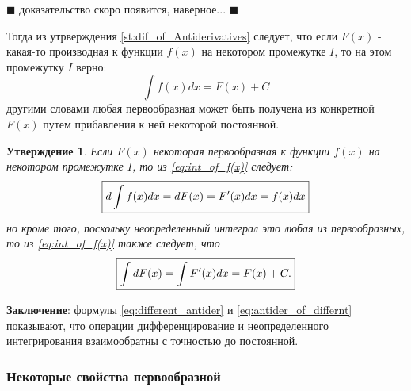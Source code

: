 \documentclass[a4paper,14pt]{article} %
\newtheorem{statement}{Утверждение}
\begin{document}
    $\blacksquare$  доказательство скоро появится, наверное... $\blacksquare$
    
    \bigskip
    \noindent Тогда из утрверждения \ref{st:dif_of_Antiderivatives} следует, что если $F(x)$ - какая-то производная к функции $f(x)$ на некотором промежутке $I$, то на этом промежутку $I$ верно: 
    \begin{equation}\label{eq:int_of_f(x)}
      \int f(x)dx = F(x) + C  
    \end{equation}
    другими словами любая первообразная может быть получена из конкретной $F(x)$ путем прибавления к ней некоторой постоянной.
    
    \begin{statement}
    Если \(F(x)\) некоторая первообразная к функции \(f(x)\) на некотором промежутке \(I\), то из \eqref{eq:int_of_f(x)} следует:
    \begin{equation}\label{eq:different_antider}
        \begin{boxed}
        {d\int f(x)dx = dF(x) = F^\prime{}(x)dx = f(x)dx}
        \end{boxed}
    \end{equation}
    но кроме того, поскольку неопределенный интеграл это любая из первообразных, то из \eqref{eq:int_of_f(x)} также следует, что
    \begin{equation}\label{eq:antider_of_differnt}
        \begin{boxed}
        {\int dF(x) = \int F^{\prime}(x)dx = F(x) + C.}
        \end{boxed}
    \end{equation}
    \end{statement}
    
    \noindent \textbf{Заключение}: формулы \eqref{eq:different_antider} и \eqref{eq:antider_of_differnt} показывают, что операции дифференцирование и неопределенного интегрирования взаимообратны с точностью до постоянной. 
    
    \subsubsection{Некоторые свойства первообразной}
\end{document}
